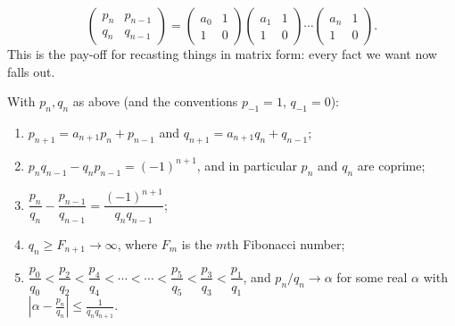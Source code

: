 \documentclass[a4paper]{scrartcl}
\begin{document}
$$\begin{pmatrix}p_n&p_{n-1}\\q_n&q_{n-1}\end{pmatrix} = \begin{pmatrix}a_0&1\\1&0\end{pmatrix}\begin{pmatrix}a_1&1\\1&0\end{pmatrix}\cdots\begin{pmatrix}a_n&1\\1&0\end{pmatrix}.$$
This is the pay-off for recasting things in matrix form: every fact we want now falls out.

\begin{theorem}\label{thm:convergent-facts}
	With $p_n, q_n$ as above (and the conventions $p_{-1}=1$, $q_{-1}=0$):
	\begin{enumerate}[label=(\roman*)]
		\item $p_{n+1} = a_{n+1}p_n+p_{n-1}$ and $q_{n+1}=a_{n+1}q_n+q_{n-1}$;
		\item $p_nq_{n-1}-q_np_{n-1} = (-1)^{n+1}$, and in particular $p_n$ and $q_n$ are coprime;
		\item $\dfrac{p_n}{q_n}-\dfrac{p_{n-1}}{q_{n-1}} = \dfrac{(-1)^{n+1}}{q_nq_{n-1}}$;
		\item $q_n \geq F_{n+1}\to\infty$, where $F_m$ is the $m$th Fibonacci number;
		\item $\dfrac{p_0}{q_0}<\dfrac{p_2}{q_2}<\dfrac{p_4}{q_4}<\cdots<\cdots<\dfrac{p_5}{q_5}<\dfrac{p_3}{q_3}<\dfrac{p_1}{q_1}$, and $p_n/q_n \to \alpha$ for some real $\alpha$ with $\left|\alpha - \frac{p_n}{q_n}\right| \leq \frac{1}{q_nq_{n+1}}$.
	\end{enumerate}
\end{theorem}
\end{document}
